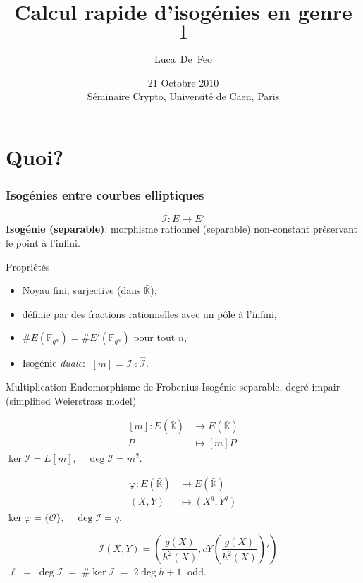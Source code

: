 \documentclass[10pt]{beamer}
\title{Calcul rapide d'isogénies en genre $1$}
\author{Luca~De~Feo}
\institute[INRIA Saclay]{INRIA Saclay, Projet TANC}
\date[Caen, 21 Octobre 2010]{21 Octobre 2010\\Séminaire Crypto, Université de Caen, Paris}
\newcommand{\clot}[1]{\bar{#1}}  %
\newcommand{\card}[1]{\# #1}  %
\newcommand{\K}{\mathbb{K}}  %
\newcommand{\F}{\mathbb{F}}  %
\newcommand{\frob}{\varphi}  %
\newcommand{\0}{\mathcal{O}}  %
\newcommand{\isog}[1]{\mathcal{#1}}  %
\newcommand{\I}{\isog{I}}  %
\begin{document}
\begin{frame}
  \titlepage
\end{frame}


\section{Quoi?}

\begin{frame}
  \frametitle{Isogénies entre courbes elliptiques}
  
  \vspace{-2mm}

  {\large \[\I:E\to E'\]}
  \textbf{Isogénie (separable)}: morphisme rationnel (separable)
  non-constant préservant le point à l'infini.
  
  \begin{block}{Propriétés}
    \begin{itemize}
    \item Noyau fini, surjective (dans $\clot{\K}$), 
    \item définie par des fractions rationnelles avec un pôle à l'infini,
    \item $\card{E(\F_{q^n})} = \card{E'(\F_{q^n})}$ pour tout $n$,
    \item Isogénie \emph{duale}: $\;[m] = \I\circ\hat{\I}$.
    \end{itemize}
  \end{block}

  \vspace{-1mm}

  \begin{block}{
	\begin{overprint}
	 Multiplication	
	\onslide<2> Endomorphisme de Frobenius
	\onslide<3> Isogénie separable, degré impair (simplified Weierstrass model)
	\end{overprint}
      }
    \begin{overprint}
      \[\begin{aligned}
	{}[m] : E(\clot{\K}) &\rightarrow E(\clot{\K})\\
	                   P &\mapsto [m]P
      \end{aligned}\]
      $\ker\I = E[m], \quad\deg\I = m^2$.

      \[\begin{aligned}
	\frob : E(\clot{\K}) &\rightarrow E(\clot{\K})\\
	               (X,Y) &\mapsto (X^q,Y^q)
      \end{aligned}\]
      $\ker\frob = \{\0\}, \quad\deg\I = q$.

      \[\quad\I(X,Y) = \left(\frac{g(X)}{h^2(X)},
      cY\left(\frac{g(X)}{h^2(X)}\right)'\right)\]
      $\;\ell\;=\;\deg\I\;=\;
      \card{\ker\I} \;=\; 2\deg h + 1\;$ odd.
    \end{overprint}
  \end{block}
\end{frame}
\end{document}
